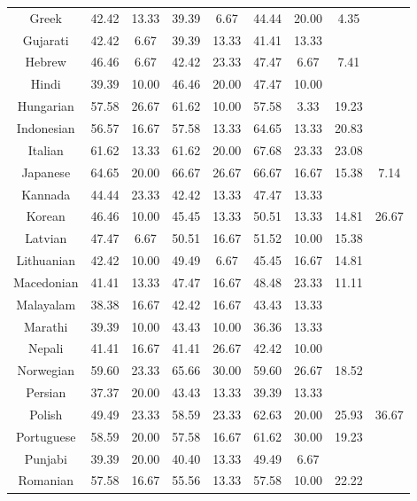\begin{table*}[]
\begin{tabular}{c|cc|cc|cccl}
Greek & 42.42 & 13.33 & 39.39 & 6.67 & 44.44 & 20.00 & 4.35 &  \\
Gujarati & 42.42 & 6.67 & 39.39 & 13.33 & 41.41 & 13.33 & \multicolumn{1}{l}{} &  \\
Hebrew & 46.46 & 6.67 & 42.42 & 23.33 & 47.47 & 6.67 & 7.41 &  \\
Hindi & 39.39 & 10.00 & 46.46 & 20.00 & 47.47 & 10.00 & \multicolumn{1}{l}{} &  \\
Hungarian & 57.58 & 26.67 & 61.62 & 10.00 & 57.58 & 3.33 & 19.23 &  \\
Indonesian & 56.57 & 16.67 & 57.58 & 13.33 & 64.65 & 13.33 & 20.83 &  \\
Italian & 61.62 & 13.33 & 61.62 & 20.00 & 67.68 & 23.33 & 23.08 &  \\
Japanese & 64.65 & 20.00 & 66.67 & 26.67 & 66.67 & 16.67 & 15.38 & \multicolumn{1}{c}{7.14} \\
Kannada & 44.44 & 23.33 & 42.42 & 13.33 & 47.47 & 13.33 & \multicolumn{1}{l}{} &  \\
Korean & 46.46 & 10.00 & 45.45 & 13.33 & 50.51 & 13.33 & 14.81 & \multicolumn{1}{c}{26.67} \\
Latvian & 47.47 & 6.67 & 50.51 & 16.67 & 51.52 & 10.00 & 15.38 &  \\
Lithuanian & 42.42 & 10.00 & 49.49 & 6.67 & 45.45 & 16.67 & 14.81 &  \\
Macedonian & 41.41 & 13.33 & 47.47 & 16.67 & 48.48 & 23.33 & 11.11 &  \\
Malayalam & 38.38 & 16.67 & 42.42 & 16.67 & 43.43 & 13.33 & \multicolumn{1}{l}{} &  \\
Marathi & 39.39 & 10.00 & 43.43 & 10.00 & 36.36 & 13.33 & \multicolumn{1}{l}{} &  \\
Nepali & 41.41 & 16.67 & 41.41 & 26.67 & 42.42 & 10.00 & \multicolumn{1}{l}{} &  \\
Norwegian & 59.60 & 23.33 & 65.66 & 30.00 & 59.60 & 26.67 & 18.52 &  \\
Persian & 37.37 & 20.00 & 43.43 & 13.33 & 39.39 & 13.33 & \multicolumn{1}{l}{} &  \\
Polish & 49.49 & 23.33 & 58.59 & 23.33 & 62.63 & 20.00 & 25.93 & \multicolumn{1}{c}{36.67} \\
Portuguese & 58.59 & 20.00 & 57.58 & 16.67 & 61.62 & 30.00 & 19.23 &  \\
Punjabi & 39.39 & 20.00 & 40.40 & 13.33 & 49.49 & 6.67 & \multicolumn{1}{l}{} &  \\
Romanian & 57.58 & 16.67 & 55.56 & 13.33 & 57.58 & 10.00 & 22.22 &  \\

\end{tabular}
\end{table*}
